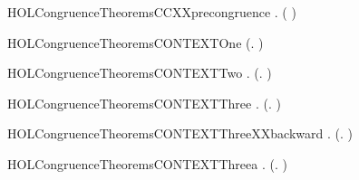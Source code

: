 \begin{SaveVerbatim}{HOLCongruenceTheoremsCCXXprecongruence}
\HOLTokenTurnstile{} \HOLSymConst{\HOLTokenForall{}}.   \HOLSymConst{\HOLTokenImp{}}  ( )
\end{SaveVerbatim}
\newcommand{\HOLCongruenceTheoremsCCXXprecongruence}{\UseVerbatim{HOLCongruenceTheoremsCCXXprecongruence}}
\begin{SaveVerbatim}{HOLCongruenceTheoremsCONTEXTOne}
\HOLTokenTurnstile{}  (\HOLTokenLambda{}. )
\end{SaveVerbatim}
\newcommand{\HOLCongruenceTheoremsCONTEXTOne}{\UseVerbatim{HOLCongruenceTheoremsCONTEXTOne}}
\begin{SaveVerbatim}{HOLCongruenceTheoremsCONTEXTTwo}
\HOLTokenTurnstile{} \HOLSymConst{\HOLTokenForall{}}.  (\HOLTokenLambda{}. )
\end{SaveVerbatim}
\newcommand{\HOLCongruenceTheoremsCONTEXTTwo}{\UseVerbatim{HOLCongruenceTheoremsCONTEXTTwo}}
\begin{SaveVerbatim}{HOLCongruenceTheoremsCONTEXTThree}
\HOLTokenTurnstile{} \HOLSymConst{\HOLTokenForall{}} .   \HOLSymConst{\HOLTokenImp{}}  (\HOLTokenLambda{}.  )
\end{SaveVerbatim}
\newcommand{\HOLCongruenceTheoremsCONTEXTThree}{\UseVerbatim{HOLCongruenceTheoremsCONTEXTThree}}
\begin{SaveVerbatim}{HOLCongruenceTheoremsCONTEXTThreeXXbackward}
\HOLTokenTurnstile{} \HOLSymConst{\HOLTokenForall{}} .  (\HOLTokenLambda{}.  ) \HOLSymConst{\HOLTokenImp{}}  
\end{SaveVerbatim}
\newcommand{\HOLCongruenceTheoremsCONTEXTThreeXXbackward}{\UseVerbatim{HOLCongruenceTheoremsCONTEXTThreeXXbackward}}
\begin{SaveVerbatim}{HOLCongruenceTheoremsCONTEXTThreea}
\HOLTokenTurnstile{} \HOLSymConst{\HOLTokenForall{}}.  (\HOLTokenLambda{}. )
\end{SaveVerbatim}
\newcommand{\HOLCongruenceTheoremsCONTEXTThreea}{\UseVerbatim{HOLCongruenceTheoremsCONTEXTThreea}}
